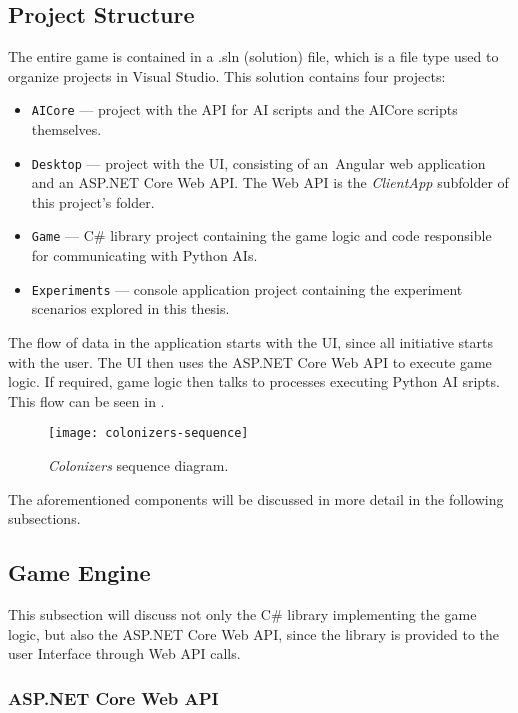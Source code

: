 \subsection{Project Structure}

The entire game is contained in a .sln (solution) file, which is a file type used
to organize projects in Visual Studio. This solution contains four projects:
\begin{itemize}
    \item \texttt{AICore} --- project with the API for AI scripts and the AICore
        scripts themselves.
    \item \texttt{Desktop} --- project with the UI, consisting of an~Angular
        web application and an ASP.NET Core Web API. The Web API is the
        \emph{ClientApp} subfolder of this project's folder.
    \item \texttt{Game} --- C\# library project containing the game logic
        and code responsible for communicating with Python AIs.
    \item \texttt{Experiments} --- console application project containing
        the experiment scenarios explored in this thesis.
\end{itemize}

The flow of data in the application starts with the UI, since all initiative starts
with the user. The UI then uses the ASP.NET Core Web API to execute game logic.
If required, game logic then talks to processes executing Python AI sripts.
This flow can be seen in .

\begin{figure}[ht]
\centerline{\mbox{\texttt{[image: colonizers-sequence]}}}
\caption{\emph{Colonizers} sequence diagram.}\label{dd:sequence}
\end{figure}

The aforementioned components will be discussed in more detail in the following subsections.

\subsection{Game Engine}

This subsection will discuss not only the C\# library implementing the game logic,
but also the ASP.NET Core Web API, since the library is provided to the user Interface
through Web API calls.

\subsubsection{ASP.NET Core Web API}

